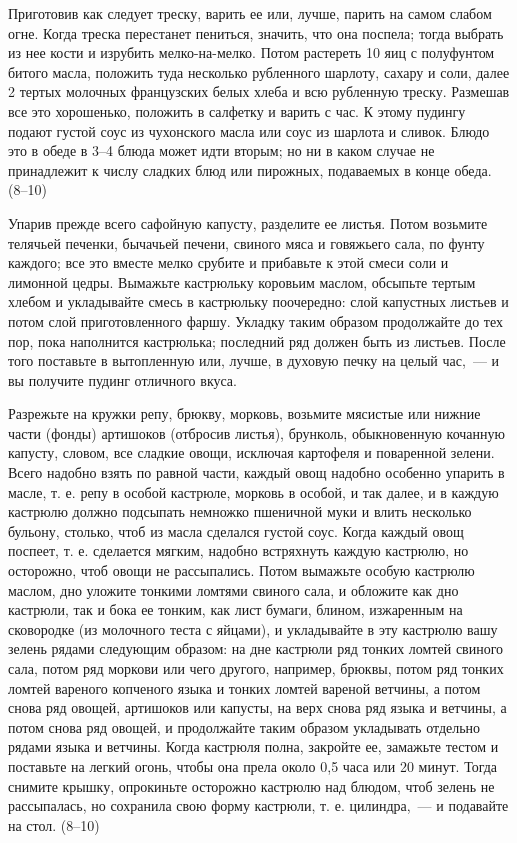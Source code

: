 
Приготовив как следует треску, варить ее или, лучше, парить на самом слабом огне. Когда треска перестанет пениться, значить, что она поспела; тогда выбрать из нее кости и изрубить мелко-на-мелко. Потом растереть 10 яиц с полуфунтом битого масла, положить туда несколько рубленного шарлоту, сахару и соли, далее 2 тертых молочных французских белых хлеба и всю рубленную треску. Размешав все это хорошенько, положить в салфетку и варить с час. К этому пудингу подают густой соус из чухонского масла или соус из шарлота и сливок. Блюдо это в обеде в 3--4 блюда может идти вторым; но ни в каком случае не принадлежит к числу сладких блюд или пирожных, подаваемых в конце обеда. (8--10) 


Упарив прежде всего сафойную капусту, разделите ее листья. Потом возьмите телячьей печенки, бычачьей печени, свиного мяса и говяжьего сала, по фунту каждого; все это вместе мелко срубите и прибавьте к этой смеси соли и лимонной цедры. Вымажьте кастрюльку коровьим маслом, обсыпьте тертым хлебом и укладывайте смесь в кастрюльку поочередно: слой капустных листьев и потом слой приготовленного фаршу. Укладку таким образом продолжайте до тех пор, пока наполнится кастрюлька; последний ряд должен быть из листьев. После того поставьте в вытопленную или, лучше, в духовую печку на целый час,~--- и вы получите пудинг отличного вкуса. 


Разрежьте на кружки репу, брюкву, морковь, возьмите мясистые или нижние части (фонды) артишоков (отбросив листья), брунколь, обыкновенную кочанную капусту, словом, все сладкие овощи, исключая картофеля и поваренной зелени. Всего надобно взять по равной части, каждый овощ надобно особенно упарить в масле, т. е. репу в особой кастрюле, морковь в особой, и так далее, и в каждую кастрюлю должно подсыпать немножко пшеничной муки и влить несколько бульону, столько, чтоб из масла сделался густой соус. Когда каждый овощ поспеет, т. е. сделается мягким, надобно встряхнуть каждую кастрюлю, но осторожно, чтоб овощи не рассыпались. Потом вымажьте особую кастрюлю маслом, дно уложите тонкими ломтями свиного сала, и обложите как дно кастрюли, так и бока ее тонким, как лист бумаги, блином, изжаренным на сковородке (из молочного теста с яйцами), и укладывайте в эту кастрюлю вашу зелень рядами следующим образом: на дне кастрюли ряд тонких ломтей свиного сала, потом ряд моркови или чего другого, например, брюквы, потом ряд тонких ломтей вареного копченого языка и тонких ломтей вареной ветчины, а потом снова ряд овощей, артишоков или капусты, на верх снова ряд языка и ветчины, а потом снова ряд овощей, и продолжайте таким образом укладывать отдельно рядами языка и ветчины. Когда кастрюля полна, закройте ее, замажьте тестом и поставьте на легкий огонь, чтобы она прела около 0,5 часа или 20 минут. Тогда снимите крышку, опрокиньте осторожно кастрюлю над блюдом, чтоб зелень не рассыпалась, но сохранила свою форму кастрюли, т. е. цилиндра,~--- и подавайте на стол. (8--10) 

